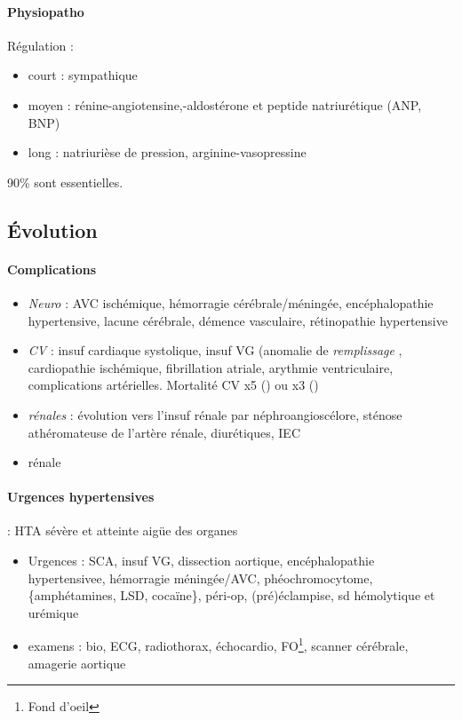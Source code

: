 \documentclass{article}
\begin{document}
\paragraph{Physiopatho}
Régulation :
\begin{itemize}
  \item court : sympathique 
  \item moyen : rénine-angiotensine,-aldostérone et peptide natriurétique (ANP,
    BNP)
  \item long : natriurièse de pression, arginine-vasopressine
\end{itemize}

90\% sont essentielles.

\subsection{Évolution}
\paragraph{Complications}
\begin{itemize}
  \item 
\textit{Neuro}  : AVC ischémique, hémorragie cérébrale/méningée, encéphalopathie
hypertensive, lacune cérébrale, démence vasculaire, rétinopathie hypertensive
\item \textit{CV}  : insuf cardiaque systolique, insuf VG (anomalie de
  \textit{remplissage} , cardiopathie ischémique, fibrillation atriale, arythmie
  ventriculaire, complications artérielles. Mortalité CV x5 (\male) ou x3 (\female)
\item \textit{rénales} : évolution vers l'insuf rénale par néphroangioscélore,
  sténose athéromateuse de l'artère rénale, diurétiques, IEC
\item rénale
\end{itemize}

\paragraph{Urgences hypertensives} : HTA sévère et atteinte aigüe des organes
\begin{itemize}
  \item Urgences : SCA, insuf VG, dissection aortique, encéphalopathie
    hypertensivee, hémorragie méningée/AVC, phéochromocytome, \{amphétamines, 
    LSD, cocaïne\}, péri-op, (pré)éclampise, sd hémolytique et urémique
  \item examens : bio, ECG, radiothorax, échocardio, FO\footnote{Fond d'oeil},
    scanner cérébrale, amagerie aortique
\end{itemize}
\end{document}
